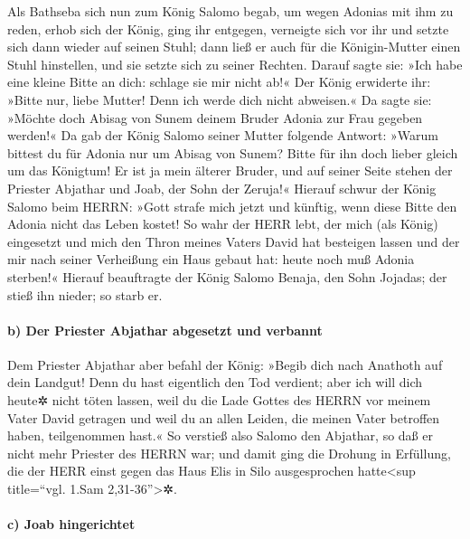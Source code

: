 Als Bathseba sich nun zum König Salomo begab, um wegen
Adonias mit ihm zu reden, erhob sich der König, ging ihr entgegen,
verneigte sich vor ihr und setzte sich dann wieder auf seinen Stuhl;
dann ließ er auch für die Königin-Mutter einen Stuhl hinstellen, und sie
setzte sich zu seiner Rechten. Darauf sagte sie: »Ich
habe eine kleine Bitte an dich: schlage sie mir nicht ab!« Der König
erwiderte ihr: »Bitte nur, liebe Mutter! Denn ich werde dich nicht
abweisen.« Da sagte sie: »Möchte doch Abisag von Sunem
deinem Bruder Adonia zur Frau gegeben werden!« Da gab der
König Salomo seiner Mutter folgende Antwort: »Warum bittest du für
Adonia nur um Abisag von Sunem? Bitte für ihn doch lieber gleich um das
Königtum! Er ist ja mein älterer Bruder, und auf seiner Seite stehen der
Priester Abjathar und Joab, der Sohn der Zeruja!« Hierauf
schwur der König Salomo beim HERRN: »Gott strafe mich jetzt und künftig,
wenn diese Bitte den Adonia nicht das Leben kostet! So
wahr der HERR lebt, der mich (als König) eingesetzt und mich den Thron
meines Vaters David hat besteigen lassen und der mir nach seiner
Verheißung ein Haus gebaut hat: heute noch muß Adonia sterben!«
Hierauf beauftragte der König Salomo Benaja, den Sohn
Jojadas; der stieß ihn nieder; so starb er.

\hypertarget{b-der-priester-abjathar-abgesetzt-und-verbannt}{%
\paragraph{b) Der Priester Abjathar abgesetzt und
verbannt}\label{b-der-priester-abjathar-abgesetzt-und-verbannt}}

Dem Priester Abjathar aber befahl der König: »Begib dich
nach Anathoth auf dein Landgut! Denn du hast eigentlich den Tod
verdient; aber ich will dich heute✲ nicht töten lassen, weil du die Lade
Gottes des HERRN vor meinem Vater David getragen und weil du an allen
Leiden, die meinen Vater betroffen haben, teilgenommen hast.«
So verstieß also Salomo den Abjathar, so daß er nicht
mehr Priester des HERRN war; und damit ging die Drohung in Erfüllung,
die der HERR einst gegen das Haus Elis in Silo ausgesprochen
hatte\textless sup title=``vgl. 1.Sam 2,31-36''\textgreater✲.

\hypertarget{c-joab-hingerichtet}{%
\paragraph{c) Joab hingerichtet}\label{c-joab-hingerichtet}}

